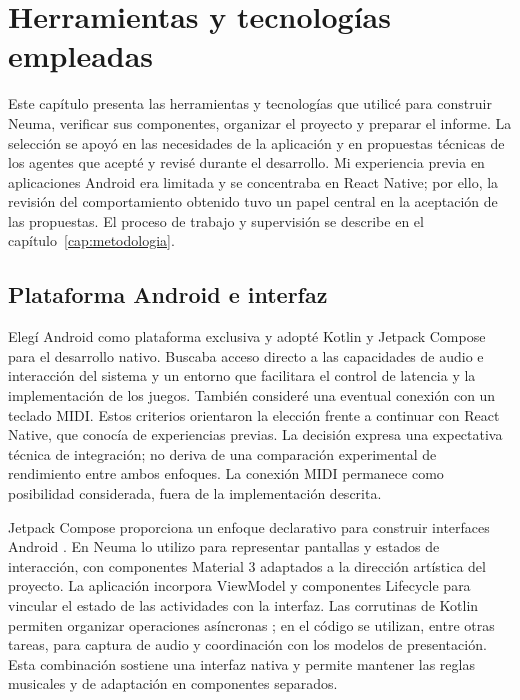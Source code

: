 \chapter[Herramientas y tecnologías empleadas]{Herramientas y tecnologías\\empleadas}
\label{cap:herramientas}
Este capítulo presenta las herramientas y tecnologías que utilicé para construir
Neuma, verificar sus componentes, organizar el proyecto y preparar el informe.
La selección se apoyó en las necesidades de la aplicación y en propuestas técnicas
de los agentes que acepté y revisé durante el desarrollo. Mi experiencia previa
en aplicaciones Android era limitada y se concentraba en React Native; por ello,
la revisión del comportamiento obtenido tuvo un papel central en la aceptación
de las propuestas. El proceso de trabajo y supervisión se describe en el
capítulo~\ref{cap:metodologia}.

\section{Plataforma Android e interfaz}
\label{sec:herramientas-android}
Elegí Android como plataforma exclusiva y adopté Kotlin y Jetpack Compose para
el desarrollo nativo. Buscaba acceso directo a las capacidades de audio e
interacción del sistema y un entorno que facilitara el control de latencia y
la implementación de los juegos. También consideré una eventual conexión con
un teclado MIDI. Estos criterios orientaron la elección frente a continuar con
React Native, que conocía de experiencias previas. La decisión expresa una
expectativa técnica de integración; no deriva de una comparación experimental
de rendimiento entre ambos enfoques. La conexión MIDI permanece como posibilidad
considerada, fuera de la implementación descrita.

Jetpack Compose proporciona un enfoque declarativo para construir interfaces
Android \parencite{androidCompose}. En Neuma lo utilizo para representar pantallas
y estados de interacción, con componentes Material 3 adaptados a la dirección
artística del proyecto. La aplicación incorpora ViewModel y componentes Lifecycle
para vincular el estado de las actividades con la interfaz. Las corrutinas de
Kotlin permiten organizar operaciones asíncronas \parencite{kotlinCorrutinas};
en el código se utilizan, entre
otras tareas, para captura de audio y coordinación con los modelos de presentación.
Esta combinación sostiene una interfaz nativa y permite mantener las reglas
musicales y de adaptación en componentes separados.

